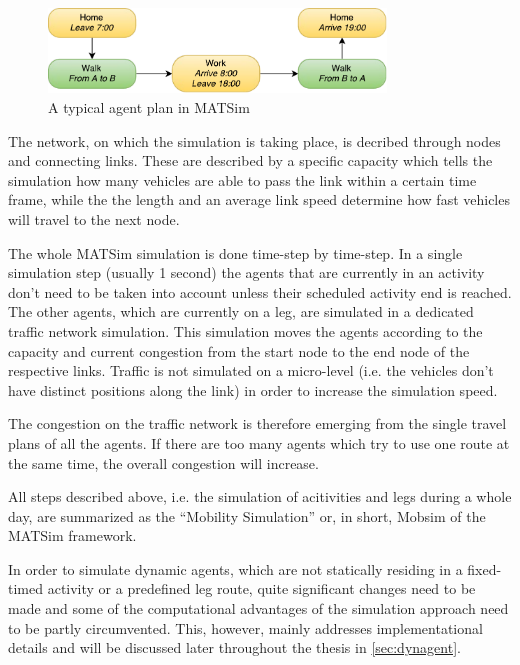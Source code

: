\begin{figure}
    \centering
    \includegraphics[width=0.8\textwidth]{figures/simpleplan.pdf}
    \caption{A typical agent plan in MATSim}
    \label{fig:typical_plan}
\end{figure}

The network, on which the simulation is taking place, is decribed through nodes
 and connecting links. These are described by a specific capacity which tells the
 simulation how many vehicles are able to pass the link within a certain time
 frame, while the the length and an average link speed determine how fast vehicles
 will travel to the next node.

 The whole MATSim simulation is done time-step by time-step. In a single simulation step (usually 1 second)
 the agents that are currently in an activity don't need to be taken into account unless their scheduled
 activity end is reached. The other agents, which are currently on a leg, are simulated in a
 dedicated traffic network simulation. This simulation moves the agents according
 to the capacity and current congestion from the start node to the end node of the
 respective links. Traffic is not simulated on a micro-level (i.e. the vehicles
 don't have distinct positions along the link) in order to increase the simulation
 speed.

The congestion on the traffic network is therefore emerging from the single travel
plans of all the agents. If there are too many agents which try to use one route
at the same time, the overall congestion will increase.

All steps described above, i.e. the simulation of acitivities and legs during
a whole day, are summarized as the ``Mobility Simulation'' or, in short, Mobsim
of the MATSim framework.

In order to simulate dynamic agents, which are not statically residing in a
fixed-timed activity or a predefined leg route, quite significant changes need
to be made and some of the computational advantages of the simulation approach
need to be partly circumvented. This, however, mainly addresses implementational
details and will be discussed later throughout the thesis in \cref{sec:dynagent}.

